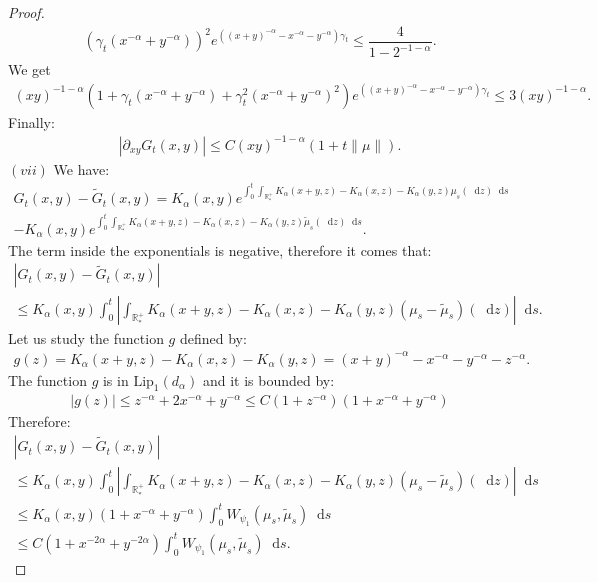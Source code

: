 \documentclass[11pt,a4paper]{article}
\newcommand{\RRP}{\mathbb{R}^+_*}
\newcommand{\dd}{\mathop{}\!\mathrm{d}}
\begin{document}
\begin{proof}
    \begin{align*}
        \left(\gamma_t (x^{-\alpha} + y^{-\alpha})\right)^2 e^{\left((x+y)^{-\alpha} - x^{-\alpha}- y^{-\alpha}\right)\gamma_t}  \leq \dfrac{4}{1-2^{-1-\alpha}}.
    \end{align*}
    We get 
    \begin{align*}
        (xy)^{-1-\alpha}\left( 1 + \gamma_t (x^{-\alpha} + y^{-\alpha}) + \gamma_t^2  (x^{-\alpha} + y^{-\alpha})^2\right)e^{\left((x+y)^{-\alpha} - x^{-\alpha}- y^{-\alpha}\right)\gamma_t} 
        \leq 3(xy)^{-1-\alpha}.
    \end{align*}
    Finally:
    \begin{align*}
        \left|\partial_{xy}G_t(x,y) \right| \leq C(xy)^{-1-\alpha} \left(1 + t\|\mu\| \right).
    \end{align*}
    $(vii)$ We have:
    \begin{multline*}
        G_t(x,y)- \tilde{G}_t(x,y) = K_\alpha(x,y) e^{\int_0^t \int_{\RRP} K_\alpha(x+y,z) - K_\alpha(x,z) -K_\alpha(y,z)\mu_s(\dd z) \dd s} \\
        - K_\alpha(x,y)e^{\int_0^t \int_{\RRP} K_\alpha(x+y,z) - K_\alpha(x,z) -K_\alpha(y,z)\tilde{\mu}_s(\dd z) \dd s}.
    \end{multline*}
    The term inside the exponentials is negative, therefore it comes that:
    \begin{multline*}
        \left| G_t(x,y)- \tilde{G}_t(x,y) \right|\\
         \leq K_\alpha(x,y)\int_0^t\left| \int_{\RRP} K_\alpha(x+y,z) - K_\alpha(x,z) -K_\alpha(y,z)\left( \mu_s - \tilde{\mu}_s\right)(\dd z) \right|\dd s.
    \end{multline*}
    Let us study the function $g$ defined by:
    \begin{align*}
        g(z) = K_\alpha(x+y,z) - K_\alpha(x,z) -K_\alpha(y,z) = (x+y)^{-\alpha} -x^{-\alpha} - y^{-\alpha} - z^{-\alpha}.
    \end{align*}
    The function $g$ is in $\text{Lip}_1(d_\alpha)$ and it is bounded by: 
    \begin{align*}
        |g(z)| \leq z^{-\alpha} + 2x^{-\alpha} + y^{-\alpha} \leq C(1 + z^{-\alpha})(1 + x^{-\alpha} + y^{-\alpha})
    \end{align*}
    Therefore:
    \begin{multline*}
        \left| G_t(x,y)- \tilde{G}_t(x,y) \right|\\ \leq K_\alpha(x,y)\int_0^t\left| \int_{\RRP} K_\alpha(x+y,z) - K_\alpha(x,z) -K_\alpha(y,z)\left( \mu_s - \tilde{\mu}_s\right)(\dd z) \right|\dd s \\
        \leq K_\alpha(x,y)(1 + x^{-\alpha} + y^{-\alpha}) \int_0^t W_{\psi_1}(\mu_s,\tilde{\mu}_s) \dd s\\
        \leq C(1 + x^{-2\alpha} + y^{-2\alpha})\int_0^t W_{\psi_1}(\mu_s,\tilde{\mu}_s) \dd s.
    \end{multline*}
    

\end{proof}
\end{document}
